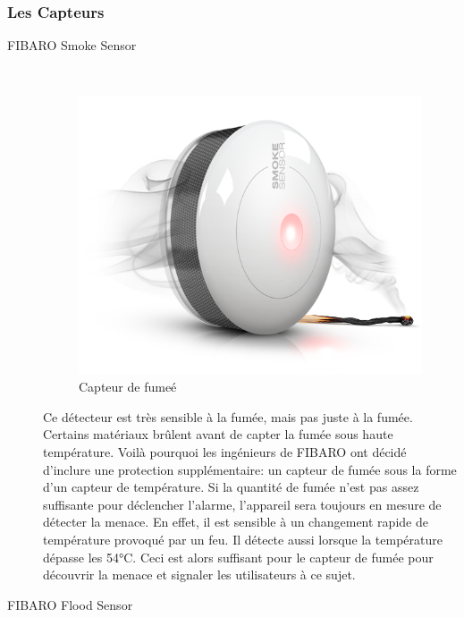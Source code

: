 \subsubsection{Les Capteurs}

\begin{description}
\item[FIBARO Smoke Sensor] \hfill \\

\begin{figure}[h]
	\center
	\includegraphics[scale=0.4]{./Images/png/smoke.png}
	\caption{Capteur de fumeé}
\end{figure}

Ce détecteur est très sensible à la fumée, mais pas juste à la fumée. Certains matériaux brûlent avant de capter la fumée sous haute température.
Voilà pourquoi les ingénieurs de  FIBARO ont décidé d'inclure une protection supplémentaire: un capteur de fumée sous la forme d'un capteur de température.
 Si la quantité de fumée n'est pas assez suffisante pour déclencher l'alarme, l'appareil sera toujours en mesure de détecter la menace.
En effet, il est sensible à un changement rapide de température provoqué par un feu. Il détecte aussi lorsque la température dépasse les 54°C. Ceci est alors suffisant pour le capteur de fumée pour découvrir la menace et signaler les utilisateurs à ce sujet. 

\item[FIBARO Flood Sensor] \hfill \\


\end{description}
